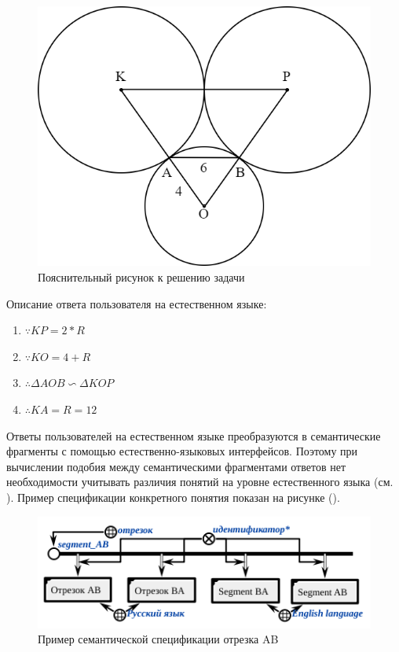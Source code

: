 \begin{figure}[H]
	\includegraphics[scale=0.3]{author/part7/figures/explanatory_illustration_example.png}
	\caption{Пояснительный рисунок к решению задачи}
	\label{fig:EI_example}
\end{figure}

Описание ответа пользователя на естественном языке:

\begin{enumerate}
	\item $\because KP = 2*R$
	\item $\because KO = 4+R$
	\item $\therefore \Delta A O B\backsim \Delta K O P$
	\item $\therefore K A = R = 12$
\end{enumerate}

Ответы пользователей на естественном языке преобразуются в семантические фрагменты с помощью естественно-языковых интерфейсов. Поэтому при вычислении подобия между семантическими фрагментами ответов нет необходимости учитывать различия понятий на уровне естественного языка (см. ). Пример спецификации конкретного понятия показан на рисунке (\textit{}).

\begin{figure}[H]
	\includegraphics[scale=0.8]{author/part7/figures/specification_segment_example.png}
	\caption{Пример семантической спецификации отрезка AB}
	\label{fig:SSE_example}
\end{figure}

